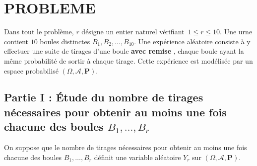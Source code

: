 \documentclass[11pt]{article}%
\begin{document}
\section*{PROBLEME}

Dans tout le problème, $r$ désigne un entier naturel vérifiant\ $1\leq
r\leq 10$. Une urne contient $10$ boules distinctes
$B_{1},B_{2},\ldots,B_{10}$. Une expérience aléatoire consiste à y
effectuer
une suite de tirages d'une boule \textbf{avec remise }, chaque boule
ayant
la même probabilité de sortir à chaque tirage. Cette expérience est
modélisée par un espace probabilisé $(\Omega,\mathcal{A},\mathbf{P})$.

\subsection*{Partie I : Étude du nombre de tirages nécessaires pour
obtenir
au moins une fois chacune des boules $B_{1},\ldots,B_{r}$}

On suppose que le nombre de tirages nécessaires pour obtenir au moins
une
fois chacune des boules $B_{1},\ldots,B_{r}$ définit une variable
aléatoire 
$Y_{r}$ sur $(\Omega,\mathcal{A},\mathbf{P})$.
\end{document}
